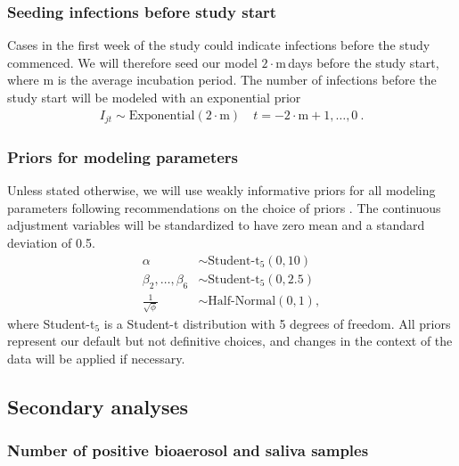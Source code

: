 \documentclass{article}
\begin{document}
\subsubsection*{Seeding infections before study start}

Cases in the first week of the study could indicate infections before the study commenced. We will therefore seed our model $2 \cdot \text{m}\,$days before the study start, where $\text{m}$ is the average incubation period. The number of infections before the study start will be modeled with an exponential prior
\begin{align*}
    I_{jt} \sim \text{Exponential}(2 \cdot \text{m}) \quad t = -2\cdot\text{m}+1, \dots, 0~. 
\end{align*}

\subsubsection*{Priors for modeling parameters}

Unless stated otherwise, we will use weakly informative priors for all modeling parameters following recommendations on the choice of priors \cite{Gelman2008StatMed,Gelman2008StatAnnals,Gelman2020RegOther,Stan2020Priors,Gabry2023Priors}. The continuous adjustment variables will be standardized to have zero mean and a standard deviation of 0.5. 
\begin{align*}
    \alpha &\sim \text{Student-t}_5(0, 10) \\
    \beta_2, \dots, \beta_6 &\sim \text{Student-t}_5(0, 2.5) \\
    \frac{1}{\sqrt{\phi}} &\sim \text{Half-Normal}(0,1),
\end{align*}
where Student-t$_5$ is a Student-t distribution with 5 degrees of freedom. All priors represent our default but not definitive choices, and changes in the context of the data will be applied if necessary.


\subsection{Secondary analyses}

\subsubsection{Number of positive bioaerosol and saliva samples}
\end{document}
